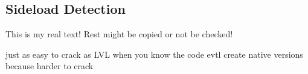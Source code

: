 \subsection{Sideload Detection} \label{subsection:evaluation-tampering-sideload}
This is my real text! Rest might be copied or not be checked!

just as easy to crack as LVL when you know the code\newline
evtl create native versions because harder to crack\newline
